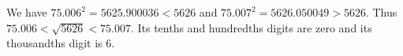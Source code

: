 We have $75.006^2=5625.900036<5626$ and $75.007^2=5626.050049>5626$. Thus $75.006<\sqrt{5626}<75.007$. Its tenths and hundredths digits are zero and its thousandths digit is $\boxed{6}$.
